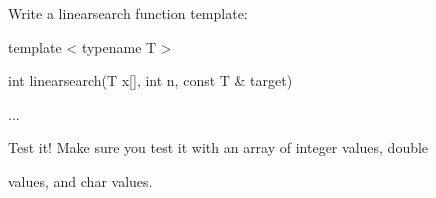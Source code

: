 Write a linearsearch function template:



\begin{console}

template  < typename T >



int linearsearch(T x[], int n, const T & target)

{

     ...

} 

\end{console}



Test it! Make sure you test it with an array of integer values, double

values, and char values.

